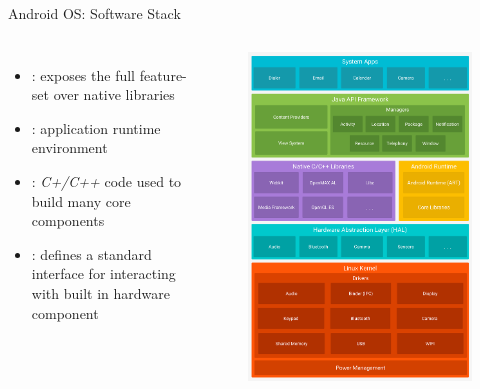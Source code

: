 \documentclass{beamer}
\begin{document}
\begin{frame}{Android OS: Software Stack}
  \begin{columns}[c]
    \begin{itemize}\itemsep10pt
      \item {}: exposes the full feature-set over native libraries
      \item {}: application runtime environment
      \item {}: \textit{C+/C++} code used to build many core components
      \item {}: defines a standard interface for interacting with built in hardware component
    \end{itemize}
      \begin{figure}
       \includegraphics[width=0.68\linewidth]{figures/android_sw_stack-new.png}
      \end{figure}
    \end{columns}
\end{frame}
\end{document}
